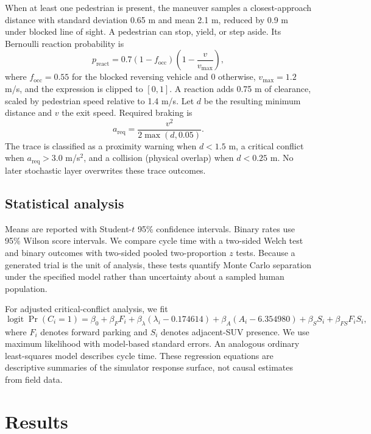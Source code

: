 \documentclass[11pt]{article}
\newcommand{\Prob}{\operatorname{Pr}}
\newcommand{\logit}{\operatorname{logit}}
\begin{document}
When at least one pedestrian is present, the maneuver samples a closest-approach distance with standard deviation 0.65 m and mean 2.1 m, reduced by 0.9 m under blocked line of sight. A pedestrian can stop, yield, or step aside. Its Bernoulli reaction probability is
\begin{equation}
 p_{\mathrm{react}}=0.7(1-f_{\mathrm{occ}})\left(1-\frac{v}{v_{\max}}\right),
\end{equation}
where $f_{\mathrm{occ}}=0.55$ for the blocked reversing vehicle and 0 otherwise, $v_{\max}=1.2$ m/s, and the expression is clipped to $[0,1]$. A reaction adds 0.75 m of clearance, scaled by pedestrian speed relative to 1.4 m/s. Let $d$ be the resulting minimum distance and $v$ the exit speed. Required braking is
\begin{equation}
 a_{\mathrm{req}}=\frac{v^2}{2\max(d,0.05)}.
\end{equation}
The trace is classified as a proximity warning when $d<1.5$ m, a critical conflict when $a_{\mathrm{req}}>3.0$ m/s$^2$, and a collision (physical overlap) when $d<0.25$ m. No later stochastic layer overwrites these trace outcomes.

\subsection{Statistical analysis}

Means are reported with Student-$t$ 95\% confidence intervals. Binary rates use 95\% Wilson score intervals. We compare cycle time with a two-sided Welch test and binary outcomes with two-sided pooled two-proportion $z$ tests. Because a generated trial is the unit of analysis, these tests quantify Monte Carlo separation under the specified model rather than uncertainty about a sampled human population.

For adjusted critical-conflict analysis, we fit
\begin{equation}
\logit\Prob(C_i=1)=\beta_0+\beta_FF_i+\beta_\lambda(\lambda_i-0.174614)
+\beta_A(A_i-6.354980)+\beta_SS_i+\beta_{FS}F_iS_i,
\label{eq:logit}
\end{equation}
where $F_i$ denotes forward parking and $S_i$ denotes adjacent-SUV presence. We use maximum likelihood with model-based standard errors. An analogous ordinary least-squares model describes cycle time. These regression equations are descriptive summaries of the simulator response surface, not causal estimates from field data.

\section{Results}
\end{document}
